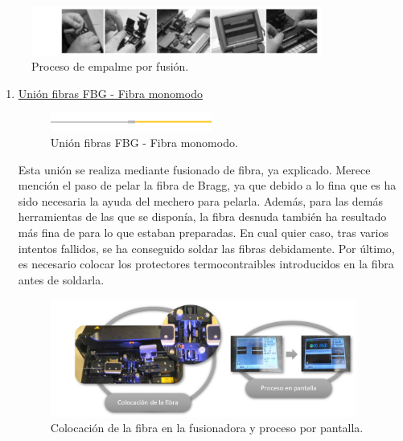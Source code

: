 \begin{itemize}
	\begin{figure}[H]
		\centering
		\includegraphics[width=0.85\textwidth]{./img/procesoFusion}
		\caption{Proceso de empalme por fusión. \cite{FOAconect}} 
		\label{fig:procFusion}
	\end{figure}
	
	
	\begin{enumerate}
		\item \underline{Unión fibras FBG - Fibra monomodo}
		
	\begin{figure}[H]
		\centering
		\includegraphics[width=0.5\textwidth]{./img/union1}
		\caption{Unión fibras FBG - Fibra monomodo.} 
		\label{fig:union1}
	\end{figure}  
	
	Esta unión se realiza mediante fusionado de fibra, ya explicado. Merece mención el paso de pelar la fibra de Bragg, ya que debido a lo fina que es ha sido necesaria la ayuda del mechero para pelarla. Además, para las demás herramientas de las que se disponía, la fibra desnuda también ha resultado más fina de para lo que estaban preparadas. En cual quier caso, tras varios intentos fallidos, se ha conseguido soldar las fibras debidamente. Por último, es necesario colocar los protectores termocontraibles introducidos en la fibra antes de soldarla.
	
	\begin{figure}[H]
		\centering
		\includegraphics[width=0.95\textwidth]{./img/fusionFOpractica}
		\caption{Colocación de la fibra en la fusionadora y proceso por pantalla.} 
		\label{fig:fusionadora}
	\end{figure}  
	

\end{enumerate}
\end{itemize}
